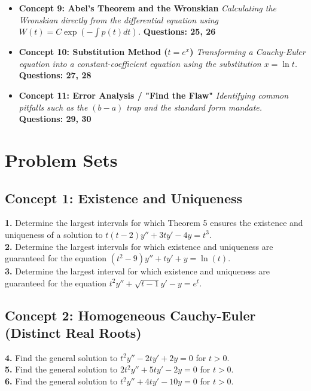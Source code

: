 \documentclass[11pt]{article}
\begin{document}
\begin{itemize}
    \item \textbf{Concept 9: Abel's Theorem and the Wronskian} 
    \textit{Calculating the Wronskian directly from the differential equation using $W(t) = C \exp(-\int p(t)dt)$.}
    \textbf{Questions: 25, 26}
    
    \item \textbf{Concept 10: Substitution Method ($t = e^x$)} 
    \textit{Transforming a Cauchy-Euler equation into a constant-coefficient equation using the substitution $x = \ln t$.}
    \textbf{Questions: 27, 28}
    
    \item \textbf{Concept 11: Error Analysis / "Find the Flaw"} 
    \textit{Identifying common pitfalls such as the $(b-a)$ trap and the standard form mandate.}
    \textbf{Questions: 29, 30}
\end{itemize}

\newpage

\section{Problem Sets}

\subsection*{Concept 1: Existence and Uniqueness}
\textbf{1.} Determine the largest intervals for which Theorem 5 ensures the existence and uniqueness of a solution to $t(t - 2)y'' + 3ty' - 4y = t^3$. \\
\textbf{2.} Determine the largest intervals for which existence and uniqueness are guaranteed for the equation $(t^2 - 9)y'' + ty' + y = \ln(t)$. \\
\textbf{3.} Determine the largest interval for which existence and uniqueness are guaranteed for the equation $t^2 y'' + \sqrt{t - 1} y' - y = e^t$.

\subsection*{Concept 2: Homogeneous Cauchy-Euler (Distinct Real Roots)}
\textbf{4.} Find the general solution to $t^2 y'' - 2ty' + 2y = 0$ for $t > 0$. \\
\textbf{5.} Find the general solution to $2t^2 y'' + 5ty' - 2y = 0$ for $t > 0$. \\
\textbf{6.} Find the general solution to $t^2 y'' + 4ty' - 10y = 0$ for $t > 0$.
\end{document}
